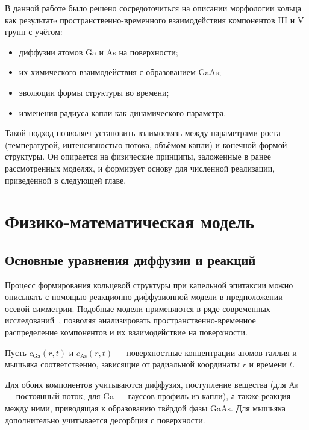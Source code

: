 \documentclass[14pt,oneside]{extarticle}
\begin{document}
В данной работе было решено сосредоточиться на описании морфологии кольца как результатe пространственно-временного взаимодействия компонентов III и V групп с учётом:
\begin{itemize}
    \item диффузии атомов Ga и As на поверхности;
    \item их химического взаимодействия с образованием GaAs;
    \item эволюции формы структуры во времени;
    \item изменения радиуса капли как динамического параметра.
\end{itemize}

Такой подход позволяет установить взаимосвязь между параметрами роста (температурой, интенсивностью потока, объёмом капли) и конечной формой структуры. Он опирается на физические принципы, заложенные в ранее рассмотренных моделях, и формирует основу для численной реализации, приведённой в следующей главе.

\pagebreak

\section{Физико-математическая модель}

\subsection{Основные уравнения диффузии и реакций}

Процесс формирования кольцевой структуры при капельной эпитаксии можно описывать с помощью реакционно-диффузионной модели в предположении осевой симметрии. Подобные модели применяются в ряде современных исследований~\cite{reyes2013, bietti2020}, позволяя анализировать пространственно-временное распределение компонентов и их взаимодействие на поверхности.

Пусть $c_{\text{Ga}}(r,t)$ и $c_{\text{As}}(r,t)$ — поверхностные концентрации атомов галлия и мышьяка соответственно, зависящие от радиальной координаты $r$ и времени $t$.

Для обоих компонентов учитываются диффузия, поступление вещества (для As — постоянный поток, для Ga — гауссов профиль из капли), а также реакция между ними, приводящая к образованию твёрдой фазы GaAs. Для мышьяка дополнительно учитывается десорбция с поверхности.
\end{document}

